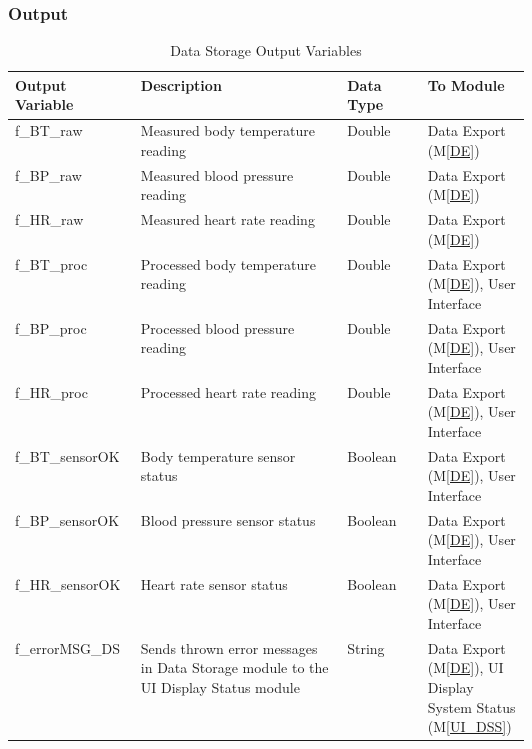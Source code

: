 \documentclass{article}
\begin{document}
\begin{description}
        \subsubsection{Output}
            \begin{longtable}{|l|p{0.4\linewidth}|l|p{0.2\linewidth}|}
            \caption{Data Storage Output Variables}
            \hline
            \textbf{Output Variable} & \textbf{Description} & \textbf {Data Type} & \textbf{To Module} \\
            \endhead
            \hline
            f\_BT\_raw   & Measured body temperature reading & Double & Data Export (M\ref{DE}) \\
            \hline
            f\_BP\_raw   & Measured blood pressure reading & Double & Data Export (M\ref{DE}) \\
            \hline
            f\_HR\_raw   & Measured heart rate reading & Double & Data Export (M\ref{DE}) \\
            \hline
            f\_BT\_proc   & Processed body temperature reading & Double & Data Export (M\ref{DE}), User Interface \\
            \hline
            f\_BP\_proc   & Processed blood pressure reading & Double & Data Export (M\ref{DE}), User Interface \\
            \hline
            f\_HR\_proc   & Processed heart rate reading & Double & Data Export (M\ref{DE}), User Interface \\
            \hline
            f\_BT\_sensorOK   & Body temperature sensor status & Boolean & Data Export (M\ref{DE}), User Interface \\
            \hline
            f\_BP\_sensorOK   & Blood pressure sensor status & Boolean & Data Export (M\ref{DE}), User Interface \\
            \hline
            f\_HR\_sensorOK   & Heart rate sensor status & Boolean & Data Export (M\ref{DE}), User Interface \\
            \hline
            f\_errorMSG\_DS   & Sends thrown error messages in Data Storage module to the UI Display Status module  & String & Data Export (M\ref{DE}), UI Display System Status (M\ref{UI_DSS})\\
            \hline
            \end{longtable}

\end{description}
\end{document}
